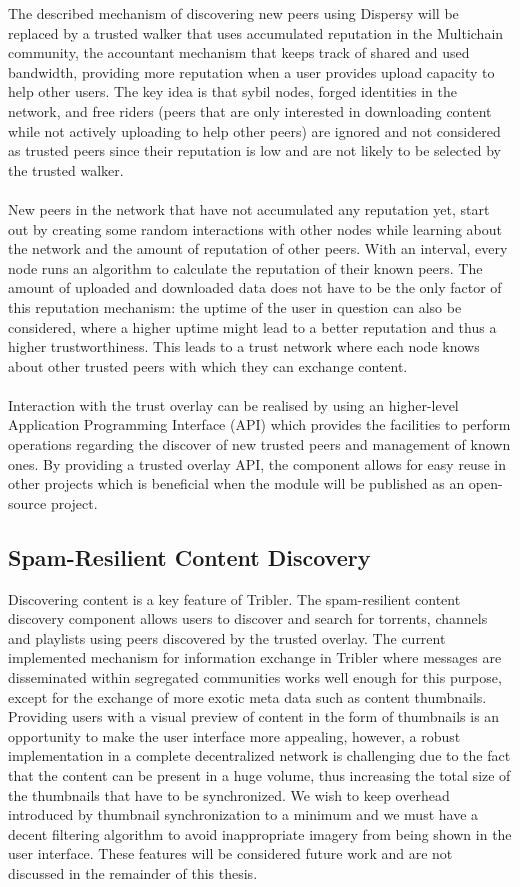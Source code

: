 The described mechanism of discovering new peers using Dispersy will be replaced by a trusted walker that uses accumulated reputation in the Multichain community, the accountant mechanism that keeps track of shared and used bandwidth, providing more reputation when a user provides upload capacity to help other users. The key idea is that sybil nodes, forged identities in the network, and free riders (peers that are only interested in downloading content while not actively uploading to help other peers) are ignored and not considered as trusted peers since their reputation is low and are not likely to be selected by the trusted walker.\\\\
New peers in the network that have not accumulated any reputation yet, start out by creating some random interactions with other nodes while learning about the network and the amount of reputation of other peers. With an interval, every node runs an algorithm to calculate the reputation of their known peers. The amount of uploaded and downloaded data does not have to be the only factor of this reputation mechanism: the uptime of the user in question can also be considered, where a higher uptime might lead to a better reputation and thus a higher trustworthiness. This leads to a trust network where each node knows about other trusted peers with which they can exchange content.\\\\
Interaction with the trust overlay can be realised by using an higher-level Application Programming Interface (API) which provides the facilities to perform operations regarding the discover of new trusted peers and management of known ones. By providing a trusted overlay API, the component allows for easy reuse in other projects which is beneficial when the module will be published as an open-source project.

\subsection{Spam-Resilient Content Discovery}
Discovering content is a key feature of Tribler. The spam-resilient content discovery component allows users to discover and search for torrents, channels and playlists using peers discovered by the trusted overlay. The current implemented mechanism for information exchange in Tribler where messages are disseminated within segregated communities works well enough for this purpose, except for the exchange of more exotic  meta data such as content thumbnails. Providing users with a visual preview of content in the form of thumbnails is an opportunity to make the user interface more appealing, however, a robust implementation in a complete decentralized network is challenging due to the fact that the content can be present in a huge volume, thus increasing the total size of the thumbnails that have to be synchronized. We wish to keep overhead introduced by thumbnail synchronization to a minimum and we must have a decent filtering algorithm to avoid inappropriate imagery from being shown in the user interface. These features will be considered future work and are not discussed in the remainder of this thesis.

